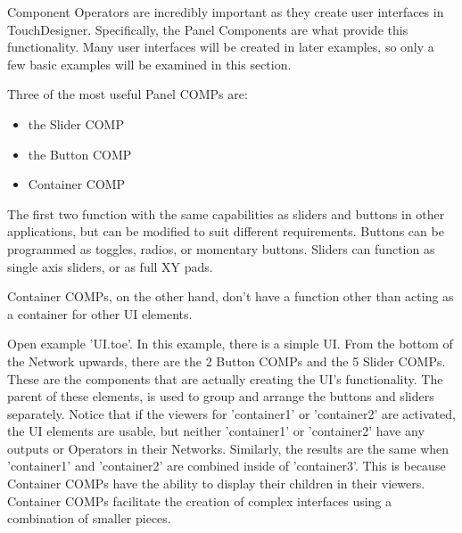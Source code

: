 \begin{fullwidth}
Component Operators are incredibly important as they create user interfaces in TouchDesigner. Specifically, the Panel Components are what provide this functionality. Many user interfaces will be created in later examples, so only a few basic examples will be examined in this section.

Three of the most useful Panel COMPs are:

\begin{itemize}
\item the Slider COMP
\item the Button COMP
\item Container COMP
\end{itemize}

The first two function with the same capabilities as sliders and buttons in other applications, but can be modified to suit different requirements. Buttons can be programmed as toggles, radios, or momentary buttons. Sliders can function as single axis sliders, or as full XY pads.

Container COMPs, on the other hand, don't have a function other than acting as a container for other UI elements.

Open example 'UI.toe'. In this example, there is a simple UI. From the bottom of the Network upwards, there are the 2 Button COMPs and the 5 Slider COMPs. These are the components that are actually creating the UI's functionality. The parent of these elements, is used to group and arrange the buttons and sliders separately. Notice that if the viewers for 'container1' or 'container2' are activated, the UI elements are usable, but neither 'container1' or 'container2' have any outputs or Operators in their Networks. Similarly, the results are the same when 'container1' and 'container2' are combined inside of 'container3'. This is because Container COMPs have the ability to display their children in their viewers. Container COMPs facilitate the creation of complex interfaces using a combination of smaller pieces.


\end{fullwidth}
